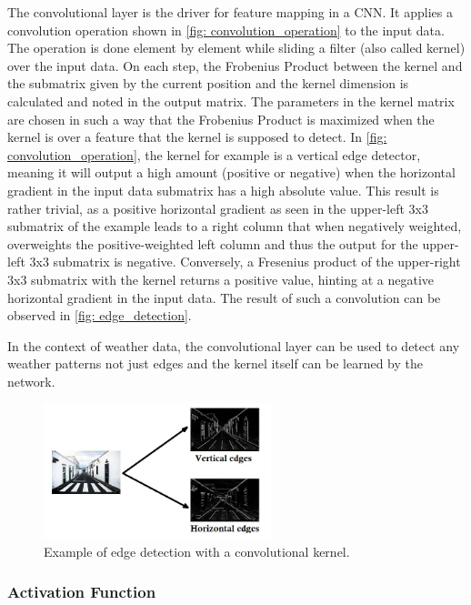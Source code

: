 The convolutional layer is the driver for feature mapping in a CNN. It applies a convolution operation shown in \autoref{fig: convolution_operation} to the input data. The operation is done element by element while sliding a filter (also called kernel) over the input data. On each step, the Frobenius Product between the kernel and the submatrix given by the current position and the kernel dimension is calculated and noted in the output matrix. The parameters in the kernel matrix are chosen in such a way that the Frobenius Product is maximized when the kernel is over a feature that the kernel is supposed to detect. In \autoref{fig: convolution_operation}, the kernel for example is a vertical edge detector, meaning it will output a high amount (positive or negative) when the horizontal gradient in the input data submatrix has a high absolute value. This result is rather trivial, as a positive horizontal gradient as seen in the upper-left 3x3 submatrix of the example leads to a right column that when negatively weighted, overweights the positive-weighted left column and thus the output for the upper-left 3x3 submatrix is negative. Conversely, a Fresenius product of the upper-right 3x3 submatrix with the kernel returns a positive value, hinting at a negative horizontal gradient in the input data. The result of such a convolution can be observed in \autoref{fig: edge_detection}.

In the context of weather data, the convolutional layer can be used to detect any weather patterns not just edges and the kernel itself can be learned by the network.

\begin{figure}
    \centering
    \includegraphics[width=250px]{resources/images/edge_detection.jpeg}
    \caption{Example of edge detection with a convolutional kernel.}
    \label{fig: edge_detection}
\end{figure}

\subsubsection*{Activation Function}

